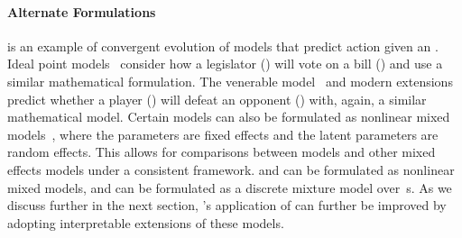 \paragraph{\textbf{Alternate Formulations}}
\irt{} is an example of convergent evolution of models that
predict \subj{} action given an \itm{}.
Ideal point models~\cite{poole2017voting} consider how a legislator (\subj{})
will vote on a bill (\itm{}) and use a similar mathematical formulation.
The venerable  model~\cite{glickman-99} and modern
extensions~\cite{herbrich-07} predict whether a player (\subj{}) will
defeat an opponent (\itm{}) with, again, a similar mathematical model.
Certain \irt{} models can also be formulated as nonlinear mixed
models~\cite{rijmen2003nonlinear}, where the \itm{} parameters are fixed effects
and the latent \subj{} parameters are random effects.
This allows for comparisons between \irt{} models and other mixed effects models
under a consistent framework.
        {\bf {}} and {\bf {}} can be formulated as nonlinear mixed models, and {\bf {}} can be formulated as a discrete mixture model over~\itm{}s.
As we discuss further in the next section, \name{}'s application of
\irt{} can further be improved by adopting interpretable extensions of
these models.


